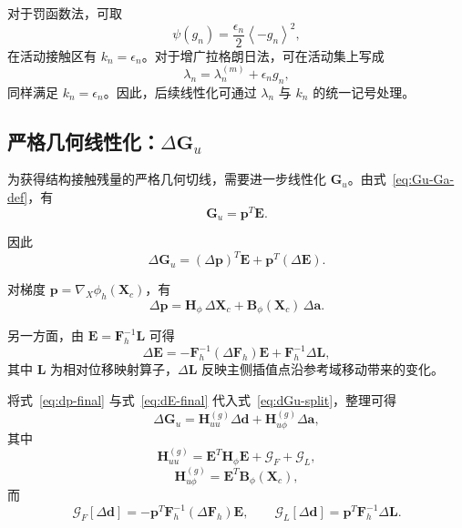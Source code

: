 \documentclass[12pt,a4paper]{ctexart}
\numberwithin{equation}{section}
\newcommand{\bF}{\bm{F}}
\newcommand{\bp}{\bm{p}}
\newcommand{\bE}{\bm{E}}
\newcommand{\bH}{\bm{H}}
\newcommand{\bB}{\bm{B}}
\newcommand{\bd}{\bm{d}}
\newcommand{\ba}{\bm{a}}
\newcommand{\bX}{\bm{X}}
\newcommand{\gradX}{\nabla_{\!X}}
\newcommand{\Mac}[1]{\left\langle #1 \right\rangle}
\begin{document}
对于罚函数法，可取
\begin{equation}
\psi(g_n)=\frac{\epsilon_n}{2}\Mac{-g_n}^2,
\end{equation}
在活动接触区有 $k_n=\epsilon_n$。对于增广拉格朗日法，可在活动集上写成
\begin{equation}
\lambda_n = \lambda_n^{(m)} + \epsilon_n g_n,
\end{equation}
同样满足 $k_n=\epsilon_n$。因此，后续线性化可通过 $\lambda_n$ 与 $k_n$ 的统一记号处理。

\subsection{严格几何线性化：\texorpdfstring{$\Delta \bm{G}_u$}{\Delta G_u}}

为获得结构接触残量的严格几何切线，需要进一步线性化 $\bm{G}_u$。由式~\eqref{eq:Gu-Ga-def}，有
\begin{equation}
\bm{G}_u = \bp^T\bE.
\end{equation}

因此
\begin{equation}
\Delta \bm{G}_u = (\Delta \bp)^T\bE + \bp^T(\Delta \bE).
\label{eq:dGu-split}
\end{equation}

对梯度 $\bp=\gradX\phi_h(\bX_c)$，有
\begin{equation}
\Delta \bp = \bH_\phi\,\Delta \bX_c + \bB_\phi(\bX_c)\,\Delta \ba.
\label{eq:dp-final}
\end{equation}

另一方面，由 $\bE=\bF_h^{-1}\bm{L}$ 可得
\begin{equation}
\Delta \bE
=
-\bF_h^{-1}(\Delta \bF_h)\bE
+
\bF_h^{-1}\Delta\bm{L},
\label{eq:dE-final}
\end{equation}
其中 $\bm{L}$ 为相对位移映射算子，$\Delta\bm{L}$ 反映主侧插值点沿参考域移动带来的变化。

将式~\eqref{eq:dp-final} 与式~\eqref{eq:dE-final} 代入式~\eqref{eq:dGu-split}，整理可得
\begin{equation}
\boxed{
\Delta \bm{G}_u
=
\bm{H}_{uu}^{(g)}\Delta\bd + \bm{H}_{u\phi}^{(g)}\Delta\ba,
}
\label{eq:dGu-final}
\end{equation}
其中
\begin{equation}
\boxed{
\bm{H}_{uu}^{(g)}
=
\bE^T\bH_\phi\bE + \bm{\mathcal G}_F + \bm{\mathcal G}_L,
}
\end{equation}
\begin{equation}
\boxed{
\bm{H}_{u\phi}^{(g)} = \bE^T\bB_\phi(\bX_c),
}
\end{equation}
而
\begin{equation}
\bm{\mathcal G}_F[\Delta\bd] = -\bp^T\bF_h^{-1}(\Delta\bF_h)\bE,
\qquad
\bm{\mathcal G}_L[\Delta\bd] = \bp^T\bF_h^{-1}\Delta \bm{L}.
\end{equation}
\end{document}
